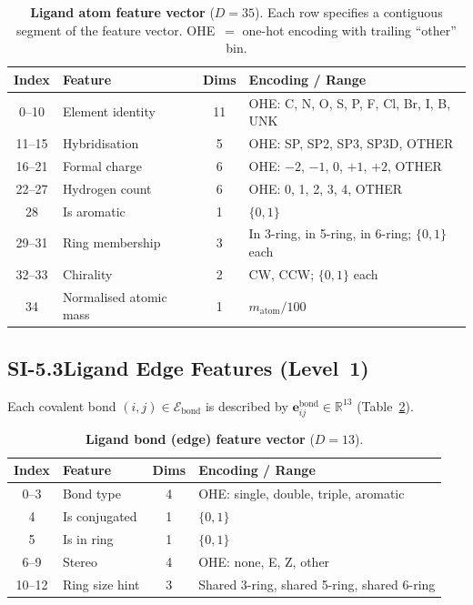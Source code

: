 \documentclass[11pt]{article}
\begin{document}
\begin{table}[H]
\small
\centering
\caption{\textbf{Ligand atom feature vector} ($D = 35$).
  Each row specifies a contiguous segment of the feature vector.
  OHE~$=$ one-hot encoding with trailing ``other'' bin.}
\label{tab:si_lig_feat}
\begin{tabular}{clcl}
\toprule
\textbf{Index} & \textbf{Feature} & \textbf{Dims} & \textbf{Encoding / Range} \\
\midrule
0--10  & Element identity        & 11 & OHE: C, N, O, S, P, F, Cl, Br, I, B, UNK \\
11--15 & Hybridisation           &  5 & OHE: SP, SP2, SP3, SP3D, OTHER \\
16--21 & Formal charge           &  6 & OHE: $-2$, $-1$, 0, $+1$, $+2$, OTHER \\
22--27 & Hydrogen count          &  6 & OHE: 0, 1, 2, 3, 4, OTHER \\
28     & Is aromatic             &  1 & $\{0, 1\}$ \\
29--31 & Ring membership         &  3 & In 3-ring, in 5-ring, in 6-ring; $\{0,1\}$ each \\
32--33 & Chirality               &  2 & CW, CCW; $\{0,1\}$ each \\
34     & Normalised atomic mass  &  1 & $m_{\mathrm{atom}} / 100$ \\
\bottomrule
\end{tabular}
\end{table}

\subsection*{SI-5.3\quad Ligand Edge Features (Level~1)}

Each covalent bond $(i, j) \in \mathcal{E}_{\mathrm{bond}}$ is described by
$\mathbf{e}_{ij}^{\mathrm{bond}} \in \mathbb{R}^{13}$ (Table~\ref{tab:si_bond_feat}).

\begin{table}[H]
\small
\centering
\caption{\textbf{Ligand bond (edge) feature vector} ($D = 13$).}
\label{tab:si_bond_feat}
\begin{tabular}{clcl}
\toprule
\textbf{Index} & \textbf{Feature} & \textbf{Dims} & \textbf{Encoding / Range} \\
\midrule
0--3   & Bond type       & 4 & OHE: single, double, triple, aromatic \\
4      & Is conjugated   & 1 & $\{0, 1\}$ \\
5      & Is in ring      & 1 & $\{0, 1\}$ \\
6--9   & Stereo          & 4 & OHE: none, E, Z, other \\
10--12 & Ring size hint  & 3 & Shared 3-ring, shared 5-ring, shared 6-ring \\
\bottomrule
\end{tabular}
\end{table}
\end{document}
